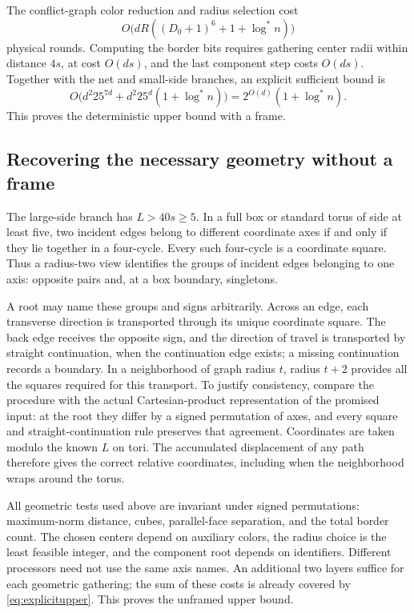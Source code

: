 \documentclass[11pt]{article}
\theoremstyle{definition}\newtheorem{definition}[theorem]{Definition}
\theoremstyle{remark}\newtheorem{remark}[theorem]{Remark}
\newcommand{\ls}{\log^*}
\begin{document}
The conflict-graph color reduction and radius selection cost
\[
                  O\bigl(dR((D_0+1)^6+1+\ls n)\bigr)
\]
physical rounds. Computing the border bits requires gathering
center radii within distance $4s$, at cost $O(ds)$, and the
last component step costs $O(ds)$. Together with the net and
small-side branches, an explicit sufficient bound is
\begin{equation}\label{eq:explicitupper}
 O\bigl(d^2 25^{7d}+d^2 25^d(1+\ls n)\bigr)
                         =2^{O(d)}(1+\ls n).
\end{equation}
This proves the deterministic upper bound with a frame.

\subsection{Recovering the necessary geometry without a frame}
\label{sec:unframed}

The large-side branch has $L>40s\ge5$. In a full box or standard
torus of side at least five, two incident edges belong to different
coordinate axes if and only if they lie together in a four-cycle.
Every such four-cycle is a coordinate square. Thus a radius-two
view identifies the groups of incident edges belonging to one
axis: opposite pairs and, at a box boundary, singletons.

A root may name these groups and signs arbitrarily. Across an
edge, each transverse direction is transported through its unique
coordinate square. The back edge receives the opposite sign,
and the direction of travel is transported by straight continuation,
when the continuation edge exists; a
missing continuation records a boundary. In a neighborhood of
graph radius $t$, radius $t+2$ provides all the squares required
for this transport. To justify consistency, compare the procedure
with the actual Cartesian-product representation of the promised
input: at the root they differ by a signed permutation of axes,
and every square and straight-continuation rule preserves that
agreement. Coordinates are taken modulo the known $L$ on tori.
The accumulated displacement of any path therefore gives the
correct relative coordinates, including when the neighborhood
wraps around the torus.

All geometric tests used above are invariant under signed
permutations: maximum-norm distance, cubes, parallel-face
separation, and the total border count. The chosen centers
depend on auxiliary colors, the radius choice is the least
feasible integer, and the component root depends on identifiers.
Different processors need not use the same axis names.
An additional two layers suffice for each geometric gathering;
the sum of these costs is already covered by
\eqref{eq:explicitupper}. This proves the unframed upper bound.
\end{document}
